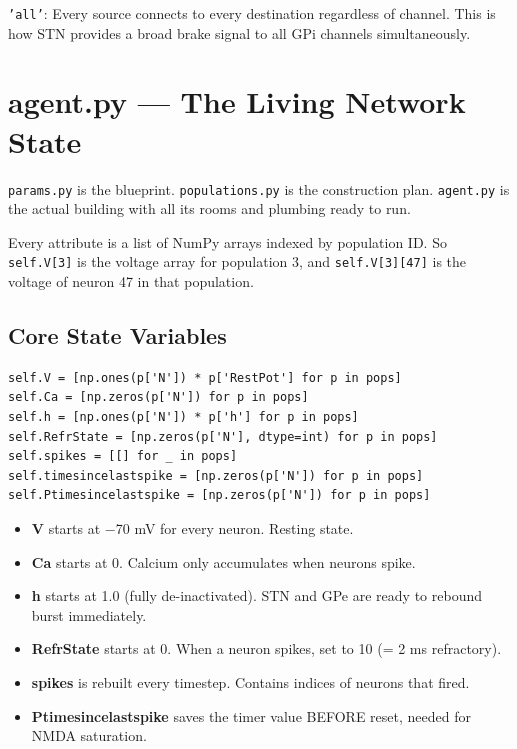 \documentclass[11pt,a4paper]{article}
\begin{document}
\texttt{'all'}: Every source connects to every destination regardless of channel. This is how STN provides a broad brake signal to all GPi channels simultaneously.

\newpage
\section{agent.py --- The Living Network State}

\texttt{params.py} is the blueprint. \texttt{populations.py} is the construction plan. \texttt{agent.py} is the actual building with all its rooms and plumbing ready to run.

Every attribute is a list of NumPy arrays indexed by population ID. So \texttt{self.V[3]} is the voltage array for population 3, and \texttt{self.V[3][47]} is the voltage of neuron 47 in that population.

\subsection{Core State Variables}

\begin{lstlisting}
self.V = [np.ones(p['N']) * p['RestPot'] for p in pops]
self.Ca = [np.zeros(p['N']) for p in pops]
self.h = [np.ones(p['N']) * p['h'] for p in pops]
self.RefrState = [np.zeros(p['N'], dtype=int) for p in pops]
self.spikes = [[] for _ in pops]
self.timesincelastspike = [np.zeros(p['N']) for p in pops]
self.Ptimesincelastspike = [np.zeros(p['N']) for p in pops]
\end{lstlisting}

\begin{itemize}
    \item \textbf{V} starts at $-$70 mV for every neuron. Resting state.
    \item \textbf{Ca} starts at 0. Calcium only accumulates when neurons spike.
    \item \textbf{h} starts at 1.0 (fully de-inactivated). STN and GPe are ready to rebound burst immediately.
    \item \textbf{RefrState} starts at 0. When a neuron spikes, set to 10 (= 2 ms refractory).
    \item \textbf{spikes} is rebuilt every timestep. Contains indices of neurons that fired.
    \item \textbf{Ptimesincelastspike} saves the timer value BEFORE reset, needed for NMDA saturation.
\end{itemize}
\end{document}
